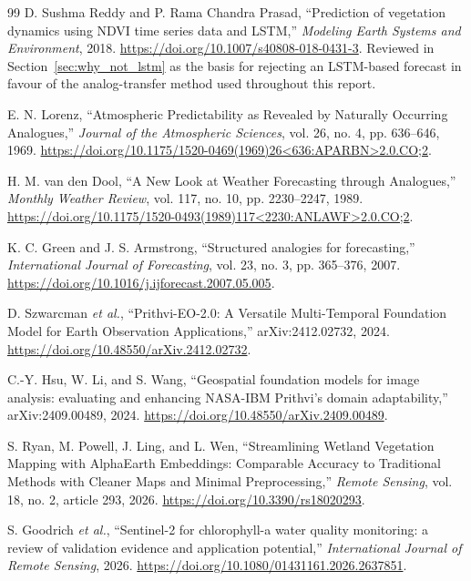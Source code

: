\documentclass[12pt,a4paper,oneside]{report}
\begin{document}
\begin{thebibliography}{99}
D. Sushma Reddy and P. Rama Chandra Prasad, ``Prediction of
vegetation dynamics using NDVI time series data and LSTM,''
\textit{Modeling Earth Systems and Environment}, 2018.
\url{https://doi.org/10.1007/s40808-018-0431-3}. Reviewed in
Section~\ref{sec:why_not_lstm} as the basis for rejecting an
LSTM-based forecast in favour of the analog-transfer method used
throughout this report.

E. N. Lorenz, ``Atmospheric Predictability as Revealed by Naturally
Occurring Analogues,'' \textit{Journal of the Atmospheric Sciences},
vol. 26, no. 4, pp. 636--646, 1969.
\url{https://doi.org/10.1175/1520-0469(1969)26<636:APARBN>2.0.CO;2}.

H. M. van den Dool, ``A New Look at Weather Forecasting through
Analogues,'' \textit{Monthly Weather Review}, vol. 117, no. 10,
pp. 2230--2247, 1989.
\url{https://doi.org/10.1175/1520-0493(1989)117<2230:ANLAWF>2.0.CO;2}.

K. C. Green and J. S. Armstrong, ``Structured analogies for
forecasting,'' \textit{International Journal of Forecasting},
vol. 23, no. 3, pp. 365--376, 2007.
\url{https://doi.org/10.1016/j.ijforecast.2007.05.005}.

D. Szwarcman \textit{et al.}, ``Prithvi-EO-2.0: A Versatile
Multi-Temporal Foundation Model for Earth Observation
Applications,'' arXiv:2412.02732, 2024.
\url{https://doi.org/10.48550/arXiv.2412.02732}.

C.-Y. Hsu, W. Li, and S. Wang, ``Geospatial foundation models for
image analysis: evaluating and enhancing NASA-IBM Prithvi's domain
adaptability,'' arXiv:2409.00489, 2024.
\url{https://doi.org/10.48550/arXiv.2409.00489}.

S. Ryan, M. Powell, J. Ling, and L. Wen, ``Streamlining Wetland
Vegetation Mapping with AlphaEarth Embeddings: Comparable Accuracy
to Traditional Methods with Cleaner Maps and Minimal Preprocessing,''
\textit{Remote Sensing}, vol. 18, no. 2, article 293, 2026.
\url{https://doi.org/10.3390/rs18020293}.

S. Goodrich \textit{et al.}, ``Sentinel-2 for chlorophyll-a water
quality monitoring: a review of validation evidence and application
potential,'' \textit{International Journal of Remote Sensing}, 2026.
\url{https://doi.org/10.1080/01431161.2026.2637851}.

\end{thebibliography}

\end{document}
